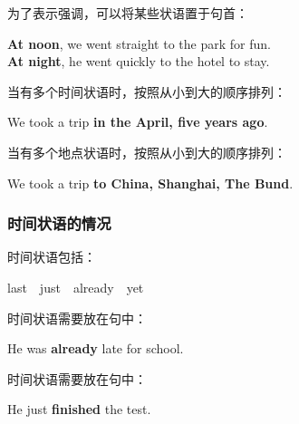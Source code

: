 \documentclass[UTF8]{ctexart}
\begin{document}
    为了表示强调，可以将某些状语置于句首：
    \begin{center}
        \ttfamily
        \large
        \textbf{At noon}, we went straight to the park for fun.\\[3mm]
        \textbf{At night}, he went quickly to the hotel to stay.\\[8mm]
    \end{center}
    当有多个时间状语时，按照从小到大的顺序排列：
    \begin{center}
        \ttfamily
        \large
        We took a trip \textbf{in the April, five years ago}.\\[8mm]
    \end{center}
    当有多个地点状语时，按照从小到大的顺序排列：
    \begin{center}
        \ttfamily
        \large
        We took a trip \textbf{to China, Shanghai, The Bund}.\\[8mm]
    \end{center}

\newpage

\subsubsection{时间状语的情况}
    时间状语包括：\vspace{-3pt}
    \begin{center}
        \ttfamily
        last~~just~~already~~yet\\[6mm]
    \end{center}
    时间状语需要放在句中：\vspace{-3pt}
    \begin{center}
        \large
        \ttfamily
        He was \textbf{already} late for school.\\[6mm]
    \end{center}
    时间状语需要放在句中：\vspace{-3pt}
    \begin{center}
        \large
        \ttfamily
        He just \textbf{finished} the test.
    \end{center}\vspace{10pt}
\end{document}
